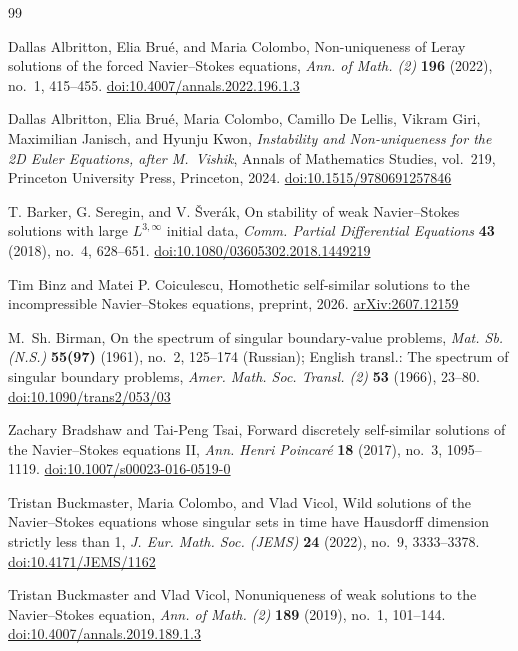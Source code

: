\begin{thebibliography}{99}
\small

Dallas Albritton, Elia Bru\'{e}, and Maria Colombo, Non-uniqueness of Leray solutions of the forced
Navier--Stokes equations, \emph{Ann. of Math. (2)} \textbf{196} (2022), no.~1, 415--455.
\href{https://doi.org/10.4007/annals.2022.196.1.3}{doi:10.4007/annals.2022.196.1.3}

Dallas Albritton, Elia Bru\'{e}, Maria Colombo, Camillo De Lellis, Vikram Giri, Maximilian Janisch, and
Hyunju Kwon, \emph{Instability and Non-uniqueness for the 2D Euler Equations, after M.~Vishik},
Annals of Mathematics Studies, vol.~219, Princeton University Press, Princeton, 2024.
\href{https://doi.org/10.1515/9780691257846}{doi:10.1515/9780691257846}

T. Barker, G. Seregin, and V. \v{S}ver\'{a}k, On stability of weak Navier--Stokes solutions with large
$L^{3,\infty}$ initial data, \emph{Comm. Partial Differential Equations} \textbf{43} (2018), no.~4,
628--651.
\href{https://doi.org/10.1080/03605302.2018.1449219}{doi:10.1080/03605302.2018.1449219}

Tim Binz and Matei P. Coiculescu, Homothetic self-similar solutions to the incompressible Navier--Stokes
equations, preprint, 2026.
\href{https://arxiv.org/abs/2607.12159}{arXiv:2607.12159}

M.~Sh. Birman, On the spectrum of singular boundary-value problems, \emph{Mat. Sb. (N.S.)}
\textbf{55(97)} (1961), no.~2, 125--174 (Russian); English transl.: The spectrum of singular boundary
problems, \emph{Amer. Math. Soc. Transl. (2)} \textbf{53} (1966), 23--80.
\href{https://doi.org/10.1090/trans2/053/03}{doi:10.1090/trans2/053/03}

Zachary Bradshaw and Tai-Peng Tsai, Forward discretely self-similar solutions of the Navier--Stokes
equations II, \emph{Ann. Henri Poincar\'{e}} \textbf{18} (2017), no.~3, 1095--1119.
\href{https://doi.org/10.1007/s00023-016-0519-0}{doi:10.1007/s00023-016-0519-0}

Tristan Buckmaster, Maria Colombo, and Vlad Vicol, Wild solutions of the Navier--Stokes equations whose
singular sets in time have Hausdorff dimension strictly less than 1, \emph{J. Eur. Math. Soc. (JEMS)}
\textbf{24} (2022), no.~9, 3333--3378.
\href{https://doi.org/10.4171/JEMS/1162}{doi:10.4171/JEMS/1162}

Tristan Buckmaster and Vlad Vicol, Nonuniqueness of weak solutions to the Navier--Stokes equation,
\emph{Ann. of Math. (2)} \textbf{189} (2019), no.~1, 101--144.
\href{https://doi.org/10.4007/annals.2019.189.1.3}{doi:10.4007/annals.2019.189.1.3}


\end{thebibliography}
